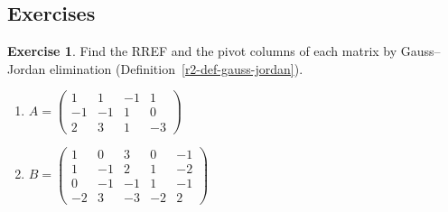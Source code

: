 \documentclass[12pt]{article}
\theoremstyle{definition}
\newtheorem{exercise}{Exercise}
\begin{document}
\subsection*{Exercises}

\begin{exercise}\label{r2-dr-rref}
Find the RREF and the pivot columns of each matrix by Gauss--Jordan elimination
(Definition~\ref{r2-def-gauss-jordan}).
\begin{enumerate}
\item \(A=\begin{pmatrix}1&1&-1&1\\-1&-1&1&0\\2&3&1&-3\end{pmatrix}\)
\item \(B=\begin{pmatrix}1&0&3&0&-1\\1&-1&2&1&-2\\0&-1&-1&1&-1\\-2&3&-3&-2&2\end{pmatrix}\)
\end{enumerate}
\end{exercise}
\end{document}
